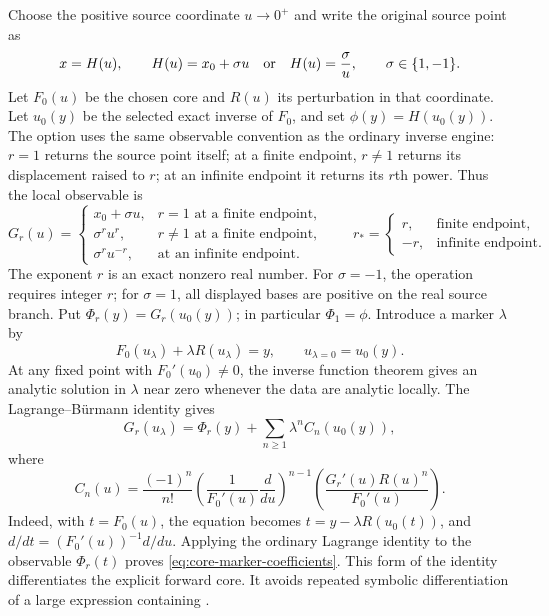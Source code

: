Choose the positive source coordinate $u\to0^+$ and write the original source point as
\[
 x=H(u),\qquad
 H(u)=x_0+\sigma u\quad\hbox{or}\quad H(u)=\frac{\sigma}{u},
 \qquad \sigma\in\{1,-1\}.
\]
Let $F_0(u)$ be the chosen core and $R(u)$ its perturbation in that coordinate. Let $u_0(y)$ be the selected exact inverse of $F_0$, and set $\phi(y)=H(u_0(y))$. The option  uses the same observable convention as the ordinary inverse engine: $r=1$ returns the source point itself; at a finite endpoint, $r\ne1$ returns its displacement raised to $r$; at an infinite endpoint it returns its $r$th power. Thus the local observable is
\begin{equation}
 G_r(u)=
 \begin{cases}
 x_0+\sigma u,&r=1\text{ at a finite endpoint},\\
 \sigma^r u^r,&r\ne1\text{ at a finite endpoint},\\
 \sigma^r u^{-r},&\text{at an infinite endpoint}.
 \end{cases}
 \qquad
 r_* = \begin{cases}r,&\text{finite endpoint},\\-r,&\text{infinite endpoint}.
 \end{cases}
 \label{eq:core-power-observable}
\end{equation}
The exponent $r$ is an exact nonzero real number. For $\sigma=-1$, the
operation requires integer $r$; for $\sigma=1$, all displayed bases are
positive on the real source branch. Put $\Phi_r(y)=G_r(u_0(y))$; in
particular $\Phi_1=\phi$. Introduce a marker $\lambda$ by
\begin{equation}
 F_0(u_\lambda)+\lambda R(u_\lambda)=y,
 \qquad u_{\lambda=0}=u_0(y).
 \label{eq:core-marker-equation}
\end{equation}
At any fixed point with $F_0'(u_0)\ne0$, the inverse function theorem gives an analytic solution in $\lambda$ near zero whenever the data are analytic locally. The Lagrange--B\"urmann identity gives
\begin{equation}
 G_r(u_\lambda)=\Phi_r(y)+\sum_{n\ge1}\lambda^n C_n(u_0(y)),
 \label{eq:core-marker-series}
\end{equation}
where
\begin{equation}
 C_n(u)=\frac{(-1)^n}{n!}
 \left(\frac{1}{F_0'(u)}\frac{d}{du}\right)^{n-1}
 \left(\frac{G_r'(u)R(u)^n}{F_0'(u)}\right).
 \label{eq:core-marker-coefficients}
\end{equation}
Indeed, with $t=F_0(u)$, the equation becomes
$t=y-\lambda R(u_0(t))$, and $d/dt=(F_0'(u))^{-1}d/du$.
Applying the ordinary Lagrange identity to the observable $\Phi_r(t)$ proves
\eqref{eq:core-marker-coefficients}. This form of the identity differentiates
the explicit forward core. It avoids repeated symbolic differentiation of a
large expression containing .

